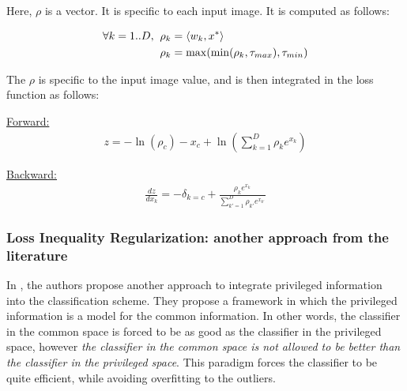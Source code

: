 Here, $\rho$ is a vector. It is specific to each input image. It is computed as follows:

\begin{align}
\forall k = 1..D, \hspace{0.2cm}
 &\rho_k = \langle w_k, x^* \rangle \nonumber \\
 &\rho_k = \max(\min(\rho_k, \tau_{max}), \tau_{min}) \nonumber
\end{align}

The $\rho$ is specific to the input image value, and is then integrated in the loss function as follows: 

  \begin{center}
  \end{center}

\noindent
\underline{Forward:} 
\begin{align}
 z = -\ln(\rho_c) - x_c + \ln( \sum_{k=1}^D \rho_k e^{x_k} ) \nonumber
\end{align}

\noindent
\underline{Backward:}
\begin{align}
 \frac{dz}{dx_k} = -\delta_{k=c} + \frac{\rho_k e^{x_k}}{\sum_{k'=1}^D \rho_{k'} e^{x_{k'}}} \nonumber
\end{align}





\subsubsection{Loss Inequality Regularization: another approach from the literature}

In \cite{WangCVPR15hiddeninfo}, the authors propose another approach to integrate privileged information into the classification scheme. They propose a framework in which the privileged information is a model for the common information. In other words, the classifier in the common space is forced to be as good as the classifier in the privileged space, however \textit{the classifier in the common space is not allowed to be better than the classifier in the privileged space}. 
This paradigm forces the classifier to be quite efficient, while avoiding overfitting to the outliers. 

